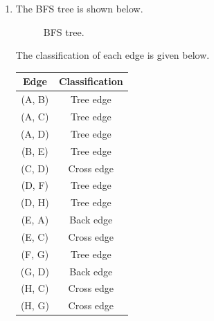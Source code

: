 \documentclass[11pt, letterpaper, titlepage]{article}
\begin{document}
\begin{enumerate}[label=(\alph*)]
    \item The BFS tree is shown below.
    \begin{figure}[H]
        \centering
        \caption{BFS tree.}
    \end{figure}
    The classification of each edge is given below.
    \begin{tabularx}{\textwidth}{cc}
        \caption{Classification of each edge for the BFS tree.} \\
        \toprule
        \textbf{Edge} & \textbf{Classification} \\
        \midrule()
        (A, B) & Tree edge \\
        (A, C) & Tree edge \\
        (A, D) & Tree edge \\
        (B, E) & Tree edge \\
        (C, D) & Cross edge \\
        (D, F) & Tree edge \\
        (D, H) & Tree edge \\
        (E, A) & Back edge \\
        (E, C) & Cross edge \\
        (F, G) & Tree edge \\
        (G, D) & Back edge \\
        (H, C) & Cross edge \\
        (H, G) & Cross edge \\
        \bottomrule
    \end{tabularx}

    \newpage
    

\end{enumerate}
\end{document}
